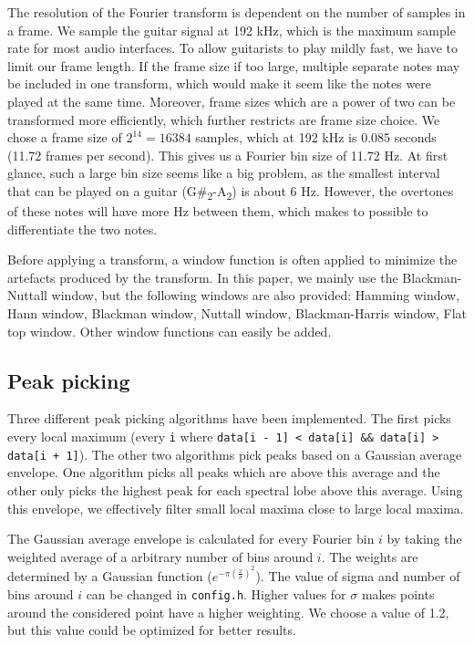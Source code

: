\documentclass[10pt,twocolumn]{article}
\begin{document}
The resolution of the Fourier transform is dependent on the number of samples in a frame. We sample the guitar signal at 192 kHz, which is the maximum sample rate for most audio interfaces. To allow guitarists to play mildly fast, we have to limit our frame length. If the frame size if too large, multiple separate notes may be included in one transform, which would make it seem like the notes were played at the same time. Moreover, frame sizes which are a power of two can be transformed more efficiently, which further restricts are frame size choice. We chose a frame size of $2^{14} = 16384$ samples, which at 192 kHz is 0.085 seconds (11.72 frames per second). This gives us a Fourier bin size of 11.72 Hz. At first glance, such a large bin size seems like a big problem, as the smallest interval that can be played on a guitar (G\#\textsubscript{2}-A\textsubscript{2}) is about 6 Hz. However, the overtones of these notes will have more Hz between them, which makes to possible to differentiate the two notes.%

Before applying a transform, a window function is often applied to minimize the artefacts produced by the transform. In this paper, we mainly use the Blackman-Nuttall window, but the following windows are also provided: Hamming window, Hann window, Blackman window, Nuttall window, Blackman-Harris window, Flat top window. Other window functions can easily be added.

\subsection{Peak picking} \label{sub:peak}
Three different peak picking algorithms have been implemented. The first picks every local maximum (every \texttt{i} where \texttt{data[i - 1] < data[i] \&\& data[i] > data[i + 1]}). The other two algorithms pick peaks based on a Gaussian average envelope. One algorithm picks all peaks which are above this average and the other only picks the highest peak for each spectral lobe above this average. Using this envelope, we effectively filter small local maxima close to large local maxima.

The Gaussian average envelope is calculated for every Fourier bin $i$ by taking the weighted average of a arbitrary number of bins around $i$. The weights are determined by a Gaussian function ($e^{-\pi(\frac{x}{\sigma})^2}$). The value of sigma and number of bins around $i$ can be changed in \texttt{config.h}. Higher values for $\sigma$ makes points around the considered point have a higher weighting. We choose a value of 1.2, but this value could be optimized for better results.
\end{document}
